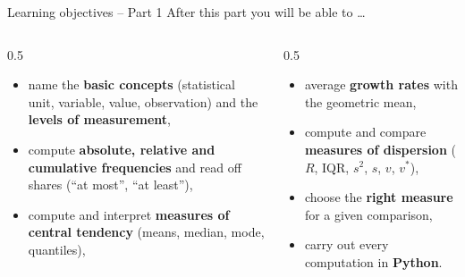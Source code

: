 \documentclass[aspectratio=169,11pt]{beamer}
\begin{document}
\begin{frame}{Learning objectives -- Part 1}
  After this part you will be able to \ldots
  \begin{columns}[T]
    \begin{column}{0.5\textwidth}
      \begin{itemize}\setlength{\itemsep}{2pt}
        \item name the \textbf{basic concepts} (statistical unit, variable,
              value, observation) and the \textbf{levels of measurement},
        \item compute \textbf{absolute, relative and cumulative
              frequencies} and read off shares (``at most'', ``at least''),
        \item compute and interpret \textbf{measures of central tendency}
              (means, median, mode, quantiles),
      \end{itemize}
    \end{column}
    \begin{column}{0.5\textwidth}
      \begin{itemize}\setlength{\itemsep}{2pt}
        \item average \textbf{growth rates} with the geometric mean,
        \item compute and compare \textbf{measures of dispersion}
              ($R$, IQR, $s^2$, $s$, $v$, $v^*$),
        \item choose the \textbf{right measure} for a given comparison,
        \item carry out every computation in \textbf{Python}.
      \end{itemize}
    \end{column}
  \end{columns}
  \vspace{-0.15cm}
\end{frame}
\end{document}
